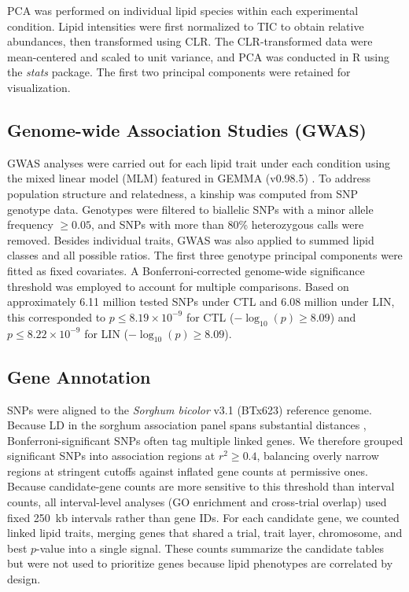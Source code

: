 \documentclass[9pt,twocolumn,twoside]{rilabRxiv}
\begin{document}
PCA was performed on individual lipid species within each experimental condition. Lipid intensities were first normalized to TIC to obtain relative abundances, then transformed using CLR. The CLR-transformed data were mean-centered and scaled to unit variance, and PCA was conducted in R using the \emph{stats} package. The first two principal components were retained for visualization.

\subsection*{Genome-wide Association Studies (GWAS)}

GWAS analyses were carried out for each lipid trait under each condition using the mixed linear model (MLM) featured in GEMMA (v0.98.5) \citep{Zhou2012}. To address population structure and relatedness, a kinship was computed from SNP genotype data. Genotypes were filtered to biallelic SNPs with a minor allele frequency $\geq 0.05$, and SNPs with more than 80\% heterozygous calls were removed. Besides individual traits, GWAS was also applied to summed lipid classes and all possible ratios. The first three genotype principal components were fitted as fixed covariates. A Bonferroni-corrected genome-wide significance threshold was employed to account for multiple comparisons. Based on approximately 6.11 million tested SNPs under CTL and 6.08 million under LIN, this corresponded to $p \le 8.19\times10^{-9}$ for CTL ($-\log_{10}(p)\ge 8.09$) and $p \le 8.22\times10^{-9}$ for LIN ($-\log_{10}(p)\ge 8.09$).

\subsection*{Gene Annotation}

SNPs were aligned to the \textit{Sorghum bicolor} v3.1 (BTx623) reference genome. Because LD in the sorghum association panel spans substantial distances \citep{Boatwright2022}, Bonferroni-significant SNPs often tag multiple linked genes. We therefore grouped significant SNPs into association regions at $r^2 \geq 0.4$, balancing overly narrow regions at stringent cutoffs against inflated gene counts at permissive ones. Because candidate-gene counts are more sensitive to this threshold than interval counts, all interval-level analyses (GO enrichment and cross-trial overlap) used fixed 250~kb intervals rather than gene IDs. For each candidate gene, we counted linked lipid traits, merging genes that shared a trial, trait layer, chromosome, and best $p$-value into a single signal. These counts summarize the candidate tables but were not used to prioritize genes because lipid phenotypes are correlated by design.
\end{document}
